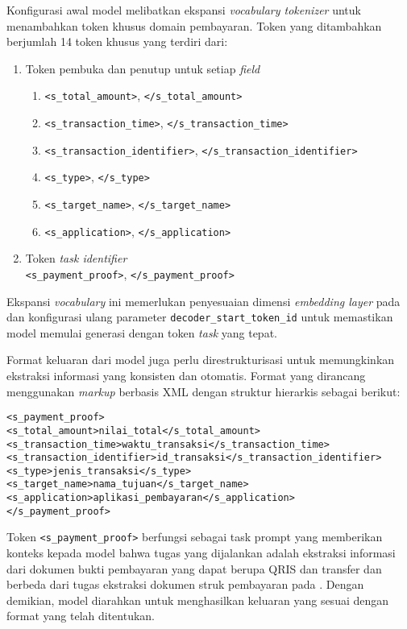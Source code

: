 Konfigurasi awal model melibatkan ekspansi \emph{vocabulary tokenizer} untuk menambahkan token khusus domain pembayaran. Token yang ditambahkan berjumlah 14 token khusus yang terdiri dari:
\begin{enumerate}
    \item Token pembuka dan penutup untuk setiap \emph{field}
    \begin{enumerate}
    \item \texttt{<s\_total\_amount>}, \texttt{</s\_total\_amount>}
    \item \texttt{<s\_transaction\_time>}, \texttt{</s\_transaction\_time>}
    \item \texttt{<s\_transaction\_identifier>}, \texttt{</s\_transaction\_identifier>}
    \item \texttt{<s\_type>}, \texttt{</s\_type>}
    \item \texttt{<s\_target\_name>}, \texttt{</s\_target\_name>}
    \item \texttt{<s\_application>}, \texttt{</s\_application>}
    \end{enumerate}
    \item Token \emph{task identifier}~\\ \texttt{<s\_payment\_proof>}, \texttt{</s\_payment\_proof>}
\end{enumerate}

Ekspansi \emph{vocabulary} ini memerlukan penyesuaian dimensi \emph{embedding layer} pada \decoder{} dan konfigurasi ulang parameter \texttt{decoder\_start\_token\_id} untuk memastikan model memulai generasi dengan token \emph{task} yang tepat.

Format keluaran dari model juga perlu direstrukturisasi untuk memungkinkan ekstraksi informasi yang konsisten dan otomatis. Format yang dirancang menggunakan \emph{markup} berbasis XML dengan struktur hierarkis sebagai berikut:

\begin{verbatim}
<s_payment_proof>
<s_total_amount>nilai_total</s_total_amount>
<s_transaction_time>waktu_transaksi</s_transaction_time>
<s_transaction_identifier>id_transaksi</s_transaction_identifier>
<s_type>jenis_transaksi</s_type>
<s_target_name>nama_tujuan</s_target_name>
<s_application>aplikasi_pembayaran</s_application>
</s_payment_proof>
\end{verbatim}

Token \texttt{<s\_payment\_proof>} berfungsi sebagai task prompt yang memberikan konteks kepada model bahwa tugas yang dijalankan adalah ekstraksi informasi dari dokumen bukti pembayaran yang dapat berupa QRIS dan transfer dan berbeda dari tugas ekstraksi dokumen struk pembayaran pada \donutcord. Dengan demikian, model diarahkan untuk menghasilkan keluaran yang sesuai dengan format yang telah ditentukan.

